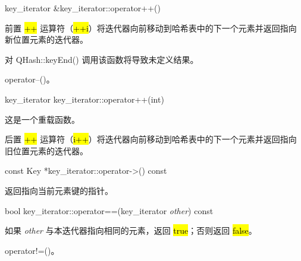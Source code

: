 key\_iterator \&key\_iterator::operator++()

前置 \hl{++} 运算符（\hl{++i}）将迭代器向前移动到哈希表中的下一个元素并返回指向新位置元素的迭代器。

对 QHash::keyEnd() 调用该函数将导致未定义结果。



\begin{seeAlso}
operator--()。
\end{seeAlso}


key\_iterator key\_iterator::operator++(int)

这是一个重载函数。

后置 \hl{++} 运算符（\hl{i++}）将迭代器向前移动到哈希表中的下一个元素并返回指向旧位置元素的迭代器。

const Key *key\_iterator::operator->() const

返回指向当前元素键的指针。

bool key\_iterator::operator==(key\_iterator \emph{other}) const

如果 \emph{other} 与本迭代器指向相同的元素，返回 \hl{true}；否则返回 \hl{false}。


\begin{seeAlso}
operator!=()。
\end{seeAlso}

